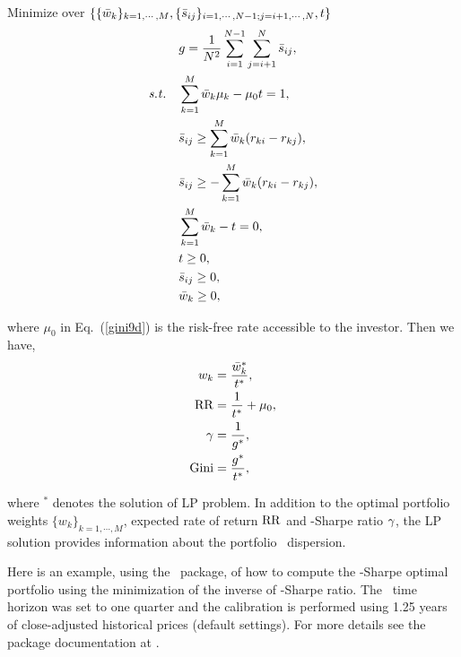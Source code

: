 \bigskip
\noindent Minimize over $\{ \{{\bar w}_k\}_{k=1,\cdots,M}, \{{\bar s}_{ij}\}_{i=1,\cdots,N-1; j = i+1,\cdots,N}, t \}$
\begin{subequations}\label{gini9}
\begin{align}
    &g = \frac{1}{N^2} \sum_{i=1}^{N-1} \sum_{j=i+1}^N \bs_{ij}, \label{gini9a} \\
    \st & \sum_{k=1}^M \bw_k\mu_k - \mu_0 t = 1, \label{gini9d} \\
        &\bs_{ij} \geq \sum_{k=1}^M \bw_k (r_{ki} - r_{kj}), \label{gini9b} \\
        &\bs_{ij} \geq -\sum_{k=1}^M \bw_k (r_{ki} - r_{kj}), \label{gini9c} \\
        & \sum_{k=1}^M \bw_k - t = 0, \label{gini9e} \\
        & t \geq 0, \label{gini9g} \\
        & \bs_{ij} \geq 0, \label{gini9h} \\
        & \bw_k \geq 0, \label{gini9f}
\end{align}
\end{subequations}

\noindent where $\mu_0$ in Eq.~(\ref{gini9d}) is the risk-free rate accessible to the investor.
Then we have,
\begin{subequations}\label{gini10}
\begin{align}
    w_k &= \frac{\bw_k^*}{t^*} , \label{gini10a} \\
    \RR &= \frac{1}{t^*} + \mu_0, \label{gini10c} \\
    \Sharpe &= \frac{1}{g^*}, \label{gini10b} \\
    \GINI &= \frac{g^*}{t^*}, \label{gini10d}
\end{align}
\end{subequations}

\noindent where $^*$ denotes the solution of LP problem.
In addition to the optimal portfolio weights $\{w_k\}_{k=1,\cdots,M}$, expected rate of return ${\rm RR}$ and
\GINI-Sharpe ratio ${\gamma}$,
the LP solution provides information about the portfolio \GINI\ dispersion.


\bigskip
\noindent Here is an example, using the \azapy\ package, of how to compute the \GINI-Sharpe optimal portfolio using the minimization
of the inverse of \GINI-Sharpe ratio.
The \GINI\ time horizon was set to one quarter and the calibration is performed using 1.25 years of
close-adjusted historical prices (default settings).
For more details see the package documentation at \azapydoc.


